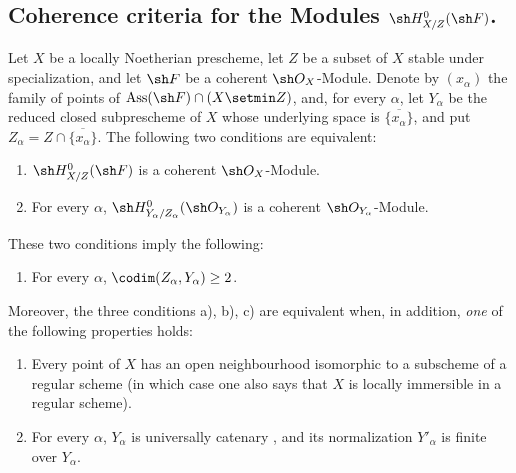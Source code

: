 
\subsection{Coherence criteria for the Modules
\texorpdfstring{$\sh H^0_{X/Z}(\sh F)$.}{H0(X/Z,F)}}
\label{subsection:IV.5.11}

\begin{proposition}[5.11.1]
\label{IV.5.11.1}
Let $X$ be a locally Noetherian prescheme, let $Z$ be a subset of
$X$ stable under specialization, and let $\sh F$ be a coherent
$\sh O_X$-Module.  Denote by $(x_\alpha)$ the family of points of $\operatorname{Ass}(\sh F)\cap(X\setmin Z)$,
and, for every $\alpha$, let $Y_\alpha$ be the reduced closed
subprescheme of $X$ whose underlying space is
$\overline{\{x_\alpha\}}$, and put
$Z_\alpha=Z\cap\overline{\{x_\alpha\}}$.  The following two
conditions are equivalent:
\begin{enumerate}[{\rm a)}]
  \item $\sh H^0_{X/Z}(\sh F)$ is a coherent $\sh O_X$-Module.
  \item For every $\alpha$,
  $\sh H^0_{Y_\alpha/Z_\alpha}(\sh O_{Y_\alpha})$ is a coherent
  $\sh O_{Y_\alpha}$-Module.
\end{enumerate}
These two conditions imply the following:
\begin{enumerate}
  \item[{\rm c)}] For every $\alpha$,
  $\codim(Z_\alpha,Y_\alpha)\geq2$.
\end{enumerate}
Moreover, the three conditions {\rm a)}, {\rm b)}, {\rm c)} are
equivalent when, in addition, \emph{one} of the following properties
holds:
\begin{enumerate}[{\rm(i)}]
  \item Every point of $X$ has an open neighbourhood isomorphic
  to a subscheme of a regular scheme \textup{(in which case one also
  says that $X$ is} locally immersible in a regular scheme\textup{)}.
  \item For every $\alpha$, $Y_\alpha$ is universally catenary
  , and its normalization
   $Y'_\alpha$ is finite over
  $Y_\alpha$.
\end{enumerate}
\end{proposition}

